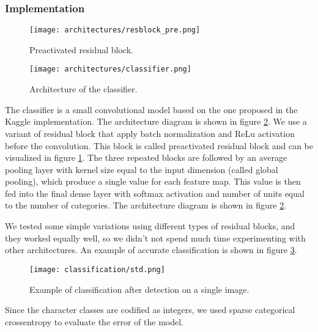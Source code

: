 \subsubsection{Implementation}
\label{sssec:implementationclass}

\begin{figure}[!hbt]
	\caption{Preactivated residual block.}
	\centering
	\texttt{[image: architectures/resblock\_pre.png]}
	\label{fig:preactresblock}
\end{figure}
\begin{figure}[!hbt]
	\caption{Architecture of the classifier.}
	\centering
	\texttt{[image: architectures/classifier.png]}
	\label{fig:classifier}
\end{figure}

\label{ssssec:networkarchitectureclass}

The classifier is a small convolutional model based on the one proposed in the Kaggle implementation. The architecture diagram is shown in figure \ref{fig:classifier}. We use a variant of residual block that apply batch normalization and ReLu activation before the convolution. This block is called preactivated residual block and can be visualized in figure \ref{fig:preactresblock}. The three repeated blocks are followed by an average pooling layer with kernel size equal to the input dimension (called global pooling), which produce a single value for each feature map. This value is then fed into the final dense layer with softmax activation and number of units equal to the number of categories. The architecture diagram is shown in figure \ref{fig:classifier}.

We tested some simple variations using different types of residual blocks, and they worked equally well, so we didn't not spend much time experimenting with other architectures. An example of accurate classification is shown in figure \ref{fig:classification-example}.
\begin{figure}
	\centering
	\texttt{[image: classification/std.png]}
	\caption{Example of classification after detection on a single image.}
	\label{fig:classification-example}
\end{figure}

\label{ssssec:lossfunctionclass}

Since the character classes are codified as integers, we used sparse categorical crossentropy to evaluate the error of the model. 

